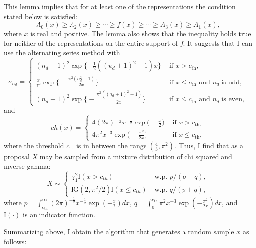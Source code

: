 \documentclass[11pt]{article}
\begin{document}
\vspace{0.5\baselineskip}

This lemma implies that for at least one of the representations the condition stated below is satisfied: 
\[
A_0(x) \ge A_2(x) \ge \cdots \ge f(x) \ge \cdots \ge A_3(x) \ge A_1(x),
\]
where $x$ is real and positive. 
The lemma also shows that the inequality holds true for neither of the representations on the entire support of $f$. 
It suggests that I can use the alternating series method with 
\begin{equation}
a_{n_d} = \begin{cases}
(n_d+1)^2 \exp\{-\frac{1}{2}((n_d+1)^2-1)x\}  & \text{ if } x> c_{\mathrm{th}}, \\
\frac{x}{\pi^2} \exp\big\{-\frac{\pi^2(n_d^2-1)}{2x}\big\} & \text{ if } x\le c_{\mathrm{th}} \text{ and } n_d \text{ is odd}, \\
(n_d+1)^2 \exp\big\{-\frac{\pi^2((n_d+1)^2-1)}{2x}\big\} & \text{ if } x\le c_{\mathrm{th}} \text{ and } n_d \text{ is even},
\end{cases}
\end{equation}
and 
\begin{equation}
ch(x)= \begin{cases}
4(2\pi)^{-\frac{1}{2}}x^{-\frac{1}{2}}\exp\big(-\frac{x}{2}\big) & \text{ if } x> c_{\mathrm{th}}, \\
4\pi^2 x^{-3} \exp\big( -\frac{\pi^2}{2x} \big) & \text{ if } x\le c_{\mathrm{th}}, 
\end{cases}
\end{equation}
where the threshold $c_{\mathrm{th}}$ is in between the range $(\frac{4}{3}, \pi^2)$. 
Thus, I find that as a proposal $X$ may be sampled from a mixture distribution of chi squared and inverse gamma:  
\begin{equation}
X \sim \begin{cases}
\chi^2_1 \mathrm{I}(x>c_{th}) & \text{ w.p. } p/(p+q), \\
\mathrm{IG}(2,\pi^2/2) \mathrm{I}(x\le c_{th}) &  \text{ w.p. } q/(p+q), 
\end{cases}
\end{equation}
where 
$p =\int_{c_{\mathrm{th}}}^{\infty}  (2\pi)^{-\frac{1}{2}}x^{-\frac{1}{2}}\exp(-\frac{x}{2})dx$, 
$q =\int_{0}^{c_{\mathrm{th}}} \pi^2 x^{-3} \exp ( -\frac{\pi^2}{2x} ) dx $, 
and $\mathrm{I}(\cdot)$ is an indicator function. 


Summarizing above, I obtain the algorithm that generates a random sample $x$ as follows: 
\end{document}
